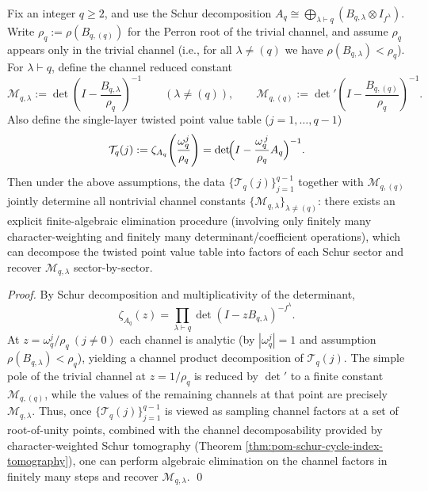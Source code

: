 \begin{theorem}\label{thm:pom-torsion-schur-dual-microscope}
Fix an integer \(q\ge2\), and use the Schur decomposition
\(
A_q\cong\bigoplus_{\lambda\vdash q}(B_{q,\lambda}\otimes I_{f^\lambda})
\).
Write \(\rho_q:=\rho(B_{q,(q)})\) for the Perron root of the trivial channel, and assume \(\rho_q\) appears only in the trivial channel (i.e., for all \(\lambda\neq(q)\) we have \(\rho(B_{q,\lambda})<\rho_q\)).
For \(\lambda\vdash q\), define the channel reduced constant
\[
\mathcal{M}_{q,\lambda}
:=
\det\!\left(I-\frac{B_{q,\lambda}}{\rho_q}\right)^{-1}\qquad(\lambda\neq(q)),
\qquad
\mathcal{M}_{q,(q)}
:=
\det\nolimits'\!\left(I-\frac{B_{q,(q)}}{\rho_q}\right)^{-1}.
\]
Also define the single-layer twisted point value table (\(j=1,\dots,q-1\))
\[
\mathcal{T}_q(j)
:=
\zeta_{A_q}\!\left(\frac{\omega_q^j}{\rho_q}\right)
=
\det\!\Bigl(I-\frac{\omega_q^{\,j}}{\rho_q}A_q\Bigr)^{-1}.
\]
Then under the above assumptions, the data \(\{\mathcal{T}_q(j)\}_{j=1}^{q-1}\) together with \(\mathcal{M}_{q,(q)}\) jointly determine all nontrivial channel constants \(\{\mathcal{M}_{q,\lambda}\}_{\lambda\neq(q)}\):
there exists an explicit finite-algebraic elimination procedure (involving only finitely many character-weighting and finitely many determinant/coefficient operations), which can decompose the twisted point value table into factors of each Schur sector and recover \(\mathcal{M}_{q,\lambda}\) sector-by-sector.
\end{theorem}
\begin{proof}
By Schur decomposition and multiplicativity of the determinant,
\[
\zeta_{A_q}(z)
=\prod_{\lambda\vdash q}\det(I-zB_{q,\lambda})^{-f^\lambda}.
\]
At \(z=\omega_q^j/\rho_q\ (j\neq0)\) each channel is analytic (by \(|\omega_q^j|=1\) and assumption \(\rho(B_{q,\lambda})<\rho_q\)), yielding a channel product decomposition of \(\mathcal{T}_q(j)\).
The simple pole of the trivial channel at \(z=1/\rho_q\) is reduced by \(\det'\) to a finite constant \(\mathcal{M}_{q,(q)}\), while the values of the remaining channels at that point are precisely \(\mathcal{M}_{q,\lambda}\).
Thus, once \(\{\mathcal{T}_q(j)\}_{j=1}^{q-1}\) is viewed as sampling channel factors at a set of root-of-unity points, combined with the channel decomposability provided by character-weighted Schur tomography (Theorem \ref{thm:pom-schur-cycle-index-tomography}), one can perform algebraic elimination on the channel factors in finitely many steps and recover \(\mathcal{M}_{q,\lambda}\).
\qed
\end{proof}

